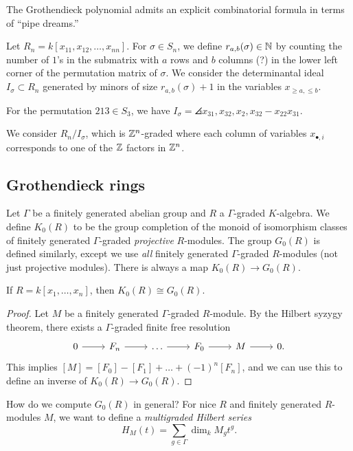 \documentclass{amsart}
\begin{document}
The Grothendieck polynomial admits an explicit combinatorial formula in terms of ``pipe dreams.''

Let $R_n = k[x_{11}, x_{12}, \dots, x_{nn}]$.
For $\sigma \in S_n$, we define $r_{a,b}(\sigma) \in \mathbb{N}$ by counting the number of $1$'s in the submatrix with $a$ rows and $b$ columns (?) in the lower left corner of the permutation matrix of $\sigma$.
We consider the determinantal ideal $I_\sigma \subset R_n$ generated by minors of size $r_{a,b}(\sigma) + 1$ in the variables $x_{\geq a, \leq b}$.

\begin{ex}
	For the permutation $213 \in S_3$, we have $I_\sigma = \angles{x_{31}, x_{32}, x_2, x_{32} - x_{22} x_{31}}$.
\end{ex}

We consider $R_n / I_\sigma$, which is $\mathbb{Z}^n$-graded where each column of variables $x_{\bullet,i}$ corresponds to one of the $\mathbb{Z}$ factors in $\mathbb{Z}^n$.

\subsection{Grothendieck rings}

Let $\Gamma$ be a finitely generated abelian group and $R$ a $\Gamma$-graded $K$-algebra.
We define $K_0(R)$ to be the group completion of the monoid of isomorphism classes of finitely generated $\Gamma$-graded \emph{projective} $R$-modules.
The group $G_0(R)$ is defined similarly, except we use \emph{all} finitely generated $\Gamma$-graded $R$-modules (not just projective modules).
There is always a map $K_0(R) \to G_0(R)$.

\begin{prop}
	If $R = k[x_1, \dots, x_n]$, then $K_0(R) \cong G_0(R)$.
\end{prop}

\begin{proof}
	Let $M$ be a finitely generated $\Gamma$-graded $R$-module.
	By the Hilbert syzygy theorem, there exists a $\Gamma$-graded finite free resolution
	\[
		\begin{tikzcd}
			0 \rar & F_n \rar & \dots \rar & F_0 \rar & M \rar & 0.
		\end{tikzcd}
	\]
	This implies $[M] = [F_0] - [F_1] + \dots + (-1)^n [F_n]$, and we can use this to define an inverse of $K_0(R) \to G_0(R)$.
\end{proof}

How do we compute $G_0(R)$ in general?
For nice $R$ and finitely generated $R$-modules $M$, we want to define a \emph{multigraded Hilbert series}
\[
	H_M(t) = \sum_{g \in \Gamma} \dim_k M_g t^g.
\]
\end{document}
